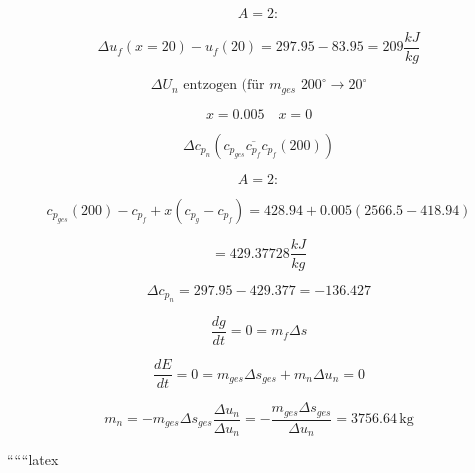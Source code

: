 \[
A = 2:
\]

\[
\Delta u_{f}(x=20) - u_{f}(20) = 297.95 - 83.95 = 209 \frac{kJ}{kg}
\]

\[
\Delta U_{n} \text{ entzogen (für } m_{ges} \text{ 200}^\circ \rightarrow 20^\circ
\]

\[
x = 0.005 \quad x = 0
\]

\[
\Delta c_{p_{n}} (c_{p_{ges}} \overline{c_{p_{f}}} c_{p_{f}} (200))
\]

\[
A = 2:
\]

\[
c_{p_{ges}} (200) - c_{p_{f}} + x (c_{p_{g}} - c_{p_{f}}) = 428.94 + 0.005 \left( 2566.5 - 418.94 \right)
\]

\[
= 429.37728 \frac{kJ}{kg}
\]

\[
\Delta c_{p_{n}} = 297.95 - 429.377 = -136.427
\]

\[
\frac{dg}{dt} = 0 = m_{f} \Delta s
\]

\[
\frac{dE}{dt} = 0 = m_{ges} \Delta s_{ges} + m_{n} \Delta u_{n} = 0
\]

\[
m_{n} = - m_{ges} \Delta s_{ges} \frac{\Delta u_{n}}{\Delta u_{n}} = - \frac{m_{ges} \Delta s_{ges}}{\Delta u_{n}} = 3756.64 \, \text{kg}
\]

``````latex


